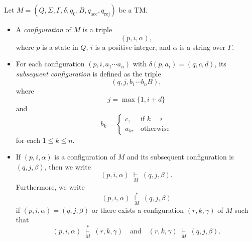 \begin{definition}
  Let $M = (Q, \Sigma, \Gamma, \delta, q_0, B, q_\text{acc}, q_\text{rej})$ be
  a TM.
  \begin{itemize}
    \item A \emph{configuration} of $M$ is a triple
    \begin{equation*}
      (p, i, \alpha),
    \end{equation*}
    where $p$ is a state in $Q$, $i$ is a positive integer, and $\alpha$ is
    a string over $\Gamma$.
    \item For each configuration $(p, i, a_1 \cdots a_n)$ with
    $\delta(p, a_i) = (q, c, d)$, its \emph{subsequent configuration} is
    defined as the triple
    \begin{equation*}
      (q, j, b_1 \cdots b_nB),
    \end{equation*}
    where
    \begin{equation*}
      j = \max\{1, i + d\}
    \end{equation*}
    and
    \begin{equation*}
      b_k =
      \begin{cases}
        c, &\text{if $k = i$} \\
        a_k, &\text{otherwise}
      \end{cases}
    \end{equation*}
    for each $1 \leq k \leq n$.
    \item If $(p, i, \alpha)$ is a configuration of $M$ and its subsequent
    configuration is $(q, j, \beta)$, then we write
    \begin{equation*}
      (p, i, \alpha)
      \; \mathop\vdash\limits_M \;
      (q, j, \beta).
    \end{equation*}
    Furthermore, we write
    \begin{equation*}
      (p, i, \alpha)
      \; \mathop\vdash\limits_M^* \;
      (q, j, \beta)
    \end{equation*}
    if $(p, i, \alpha) = (q, j, \beta)$ or there exists a configuration
    $(r, k, \gamma)$ of $M$ such that
    \begin{equation*}
      (p, i, \alpha)
      \; \mathop\vdash\limits_M^* \;
      (r, k, \gamma)
      \quad \text{and} \quad
      (r, k, \gamma)
      \; \mathop\vdash\limits_M \;
      (q, j, \beta).
    \end{equation*}
  \end{itemize}
\end{definition}

